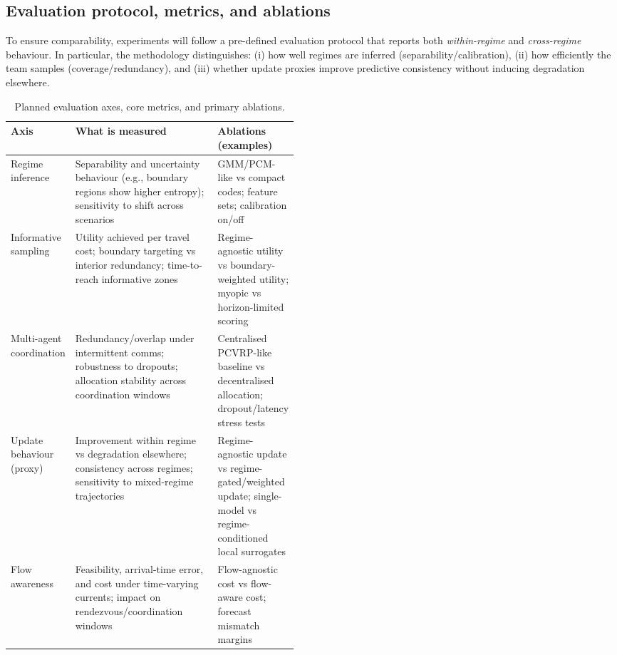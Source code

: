 \subsection{Evaluation protocol, metrics, and ablations} \label{sec:metrics_ablations}
To ensure comparability, experiments will follow a pre-defined evaluation protocol that reports both \emph{within-regime} and \emph{cross-regime} behaviour.
In particular, the methodology distinguishes: (i) how well regimes are inferred (separability/calibration), (ii) how efficiently the team samples (coverage/redundancy),
and (iii) whether update proxies improve predictive consistency without inducing degradation elsewhere.

\begin{table}[H]
  \centering
  \caption{Planned evaluation axes, core metrics, and primary ablations.}
  \label{tab:eval_axes}
  \scriptsize
  \renewcommand{\arraystretch}{1.15}
  \setlength{\tabcolsep}{4pt}
  \begin{tabularx}{\linewidth}{>{\RaggedRight\arraybackslash}p{0.22\linewidth} X >{\RaggedRight\arraybackslash}p{0.25\linewidth}}
    \hline
    \textbf{Axis} & \textbf{What is measured} & \textbf{Ablations (examples)} \\
    \hline
    Regime inference &
    Separability and uncertainty behaviour (e.g., boundary regions show higher entropy); sensitivity to shift across scenarios &
    GMM/PCM-like vs compact codes; feature sets; calibration on/off \\
    \hline
    Informative sampling &
    Utility achieved per travel cost; boundary targeting vs interior redundancy; time-to-reach informative zones &
    Regime-agnostic utility vs boundary-weighted utility; myopic vs horizon-limited scoring \\
    \hline
    Multi-agent coordination &
    Redundancy/overlap under intermittent comms; robustness to dropouts; allocation stability across coordination windows &
    Centralised PCVRP-like baseline vs decentralised allocation; dropout/latency stress tests \\
    \hline
    Update behaviour (proxy) &
    Improvement within regime vs degradation elsewhere; consistency across regimes; sensitivity to mixed-regime trajectories &
    Regime-agnostic update vs regime-gated/weighted update; single-model vs regime-conditioned local surrogates \\
    \hline
    Flow awareness &
    Feasibility, arrival-time error, and cost under time-varying currents; impact on rendezvous/coordination windows &
    Flow-agnostic cost vs flow-aware cost; forecast mismatch margins \\
    \hline
  \end{tabularx}
\end{table}

